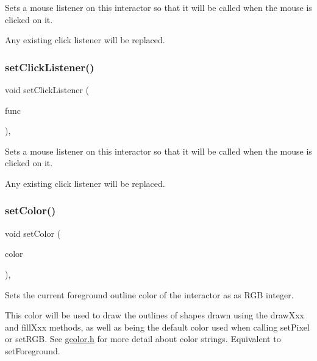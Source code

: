 Sets a mouse listener on this interactor so that it will be called when the mouse is clicked on it. 

Any existing click listener will be replaced. \mbox{\label{classGInteractor_a856414c92df90f56f3877475eb3f8fc4}} 
\subsubsection{\texorpdfstring{set\+Click\+Listener()}{setClickListener()}\hspace{0.1cm}{\footnotesize\ttfamily [2/2]}}
{\footnotesize\ttfamily void set\+Click\+Listener (\begin{DoxyParamCaption}\item[{G\+Event\+Listener\+Void}]{func }\end{DoxyParamCaption})\hspace{0.3cm}{\ttfamily [virtual]}, {\ttfamily [inherited]}}



Sets a mouse listener on this interactor so that it will be called when the mouse is clicked on it. 

Any existing click listener will be replaced. \mbox{\label{classGCanvas_af6e1bcf23a09a0ae0607daff81ee45fa}} 
\subsubsection{\texorpdfstring{set\+Color()}{setColor()}\hspace{0.1cm}{\footnotesize\ttfamily [1/2]}}
{\footnotesize\ttfamily void set\+Color (\begin{DoxyParamCaption}\item[{int}]{color }\end{DoxyParamCaption})\hspace{0.3cm}{\ttfamily [override]}, {\ttfamily [virtual]}}



Sets the current foreground outline color of the interactor as as R\+GB integer. 

This color will be used to draw the outlines of shapes drawn using the draw\+Xxx and fill\+Xxx methods, as well as being the default color used when calling set\+Pixel or set\+R\+GB. See \mbox{\hyperlink{gcolor_8h_source}{gcolor.\+h}} for more detail about color strings. Equivalent to set\+Foreground. 

